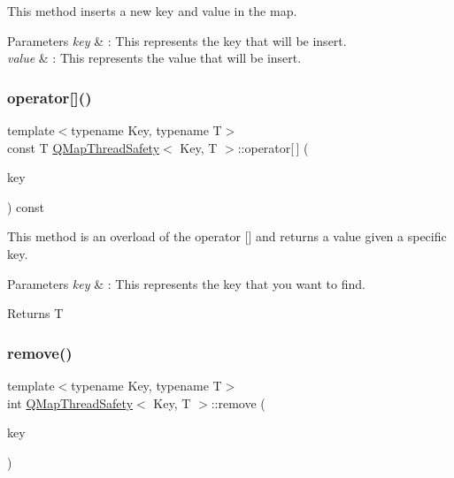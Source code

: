 This method inserts a new key and value in the map. 


\begin{DoxyParams}{Parameters}
{\em key} & \+: This represents the key that will be insert. \\
\hline
{\em value} & \+: This represents the value that will be insert. \\
\hline
\end{DoxyParams}
\mbox{\label{class_q_map_thread_safety_a0cdacf0e7048c4ef7e0960a371c32668}} 
\subsubsection{\texorpdfstring{operator[]()}{operator[]()}}
{\footnotesize\ttfamily template$<$typename Key, typename T$>$ \\
const T \hyperlink{class_q_map_thread_safety}{Q\+Map\+Thread\+Safety}$<$ Key, T $>$\+::operator\mbox{[}$\,$\mbox{]} (\begin{DoxyParamCaption}\item[{const Key \&}]{key }\end{DoxyParamCaption}) const\hspace{0.3cm}{\ttfamily [inline]}}



This method is an overload of the operator \mbox{[}\mbox{]} and returns a value given a specific key. 


\begin{DoxyParams}{Parameters}
{\em key} & \+: This represents the key that you want to find. \\
\hline
\end{DoxyParams}
\begin{DoxyReturn}{Returns}
T 
\end{DoxyReturn}
\mbox{\label{class_q_map_thread_safety_a91e703ad03572023876108c2b7bc3540}} 
\subsubsection{\texorpdfstring{remove()}{remove()}}
{\footnotesize\ttfamily template$<$typename Key, typename T$>$ \\
int \hyperlink{class_q_map_thread_safety}{Q\+Map\+Thread\+Safety}$<$ Key, T $>$\+::remove (\begin{DoxyParamCaption}\item[{const Key \&}]{key }\end{DoxyParamCaption})\hspace{0.3cm}{\ttfamily [inline]}}



